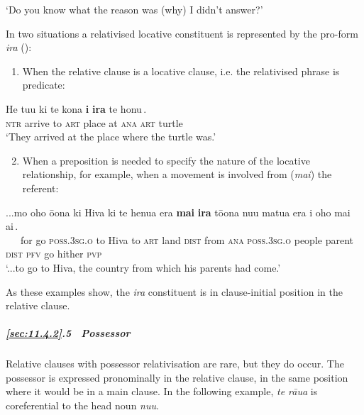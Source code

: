 \glt
‘Do you know what the reason was (why) I didn’t answer?’ \textstyleExampleref{[R363.109]} 
\z

In two situations a relativised locative constituent is represented by the pro-form \textit{ira} (): 

\begin{enumerate}
\item 
When the relative clause is a locative clause, i.e. the relativised phrase is predicate:
\end{enumerate}

\ea\label{ex:11.100}
\gll He tu{\ꞌ}u ki te kona {\ob}\textbf{{\ꞌ}i} \textbf{ira} te honu\,{\cb}. \\
\textsc{ntr} arrive to \textsc{art} place {\db}at \textsc{ana} \textsc{art} turtle \\

\glt
‘They arrived at the place where the turtle was.’ \textstyleExampleref{[R532-03.008]}
\z

\begin{enumerate}
\setcounter{enumi}{1}
\item 
When a preposition is needed to specify the nature of the locative relationship, for example, when a movement is involved from (\textit{mai}) the referent:
\setcounter{enumi}{1}
\end{enumerate}

\ea\label{ex:11.101}
\gll ...mo oho ō{\ꞌ}ona ki Hiva ki te henua era {\ob}\textbf{mai} \textbf{ira} tō{\ꞌ}ona nu{\ꞌ}u matu{\ꞌ}a era i oho mai ai\,{\cb}. \\
~~~for go \textsc{poss.3sg.o} to Hiva to \textsc{art} land \textsc{dist} {\db}from \textsc{ana} \textsc{poss.3sg.o} people parent \textsc{dist} \textsc{pfv} go hither \textsc{pvp} \\

\glt
‘...to go to Hiva, the country from which his parents had come.’ \textstyleExampleref{[R370.002]} 
\z


As these examples show, the \textit{ira} constituent is in clause-initial position in the relative clause.

\subparagraph{\ref{sec:11.4.2}.5~ Possessor} Relative clauses with possessor relativisation are rare, but they do occur. The possessor is expressed pronominally in the relative clause, in the same position where it would be in a main clause. In the following example, \textit{te rāua} is coreferential to the head noun \textit{nu{\ꞌ}u}.

